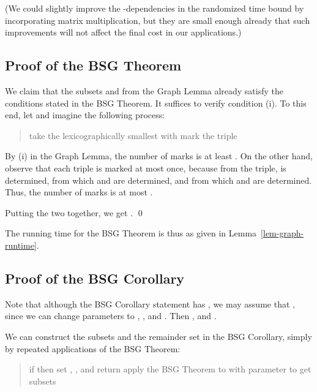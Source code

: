 \documentclass[11pt]{article}
\newcommand{\IGNORE}[1]{}
\begin{document}
{(We could slightly improve the -dependencies in the randomized time bound by incorporating matrix multiplication,
but they are small enough already that such improvements will not affect the final cost in our applications.)



\subsection{Proof of the BSG Theorem}\label{sec-bsg-proof}




We claim that the subsets  and  from the Graph Lemma
already satisfy the conditions stated in the BSG Theorem.
It suffices to verify condition (i).
To this end, let  and imagine
the following process:

\begin{quote}
\begin{algorithmic}

 \State   take the lexicographically smallest  with 
 \State mark the triple 
\EndFor
\EndFor
 \end{algorithmic}
\end{quote}

By (i) in the Graph Lemma, the number of marks is at least
.
On the other hand, observe that each triple  is
marked at most once, because from the triple,
 is determined, from which
 and  are determined, and from which
 and  are determined.
Thus, the number of marks is at most .

Putting the two together, we get
.
\qed

\bigskip
The running time for the BSG Theorem is thus as given in Lemma~\ref{lem-graph-runtime}.

\subsection{Proof of the BSG Corollary}\label{sec-bsg-corollary-proof}

Note that although the BSG Corollary statement
has , we may assume that , since
we can change parameters to ,
, and .
Then , and
.

We can construct the subsets  and
the remainder set  in the BSG Corollary, simply by
repeated applications of the BSG Theorem:

\begin{quote}
\begin{algorithmic}[1]
  \State 
  \For {}
    \State if  then set , , and return
    \State apply the BSG Theorem to 
with parameter 
       to get subsets 
    \State  
  \EndFor
 \end{algorithmic}
\end{quote}
\IGNORE{
In line~3, the parameters in the BSG Theorem are
, , and .
Note that .
}


}
\end{document}
